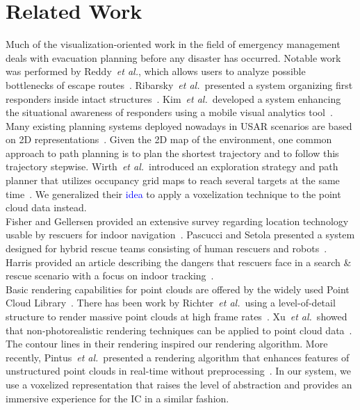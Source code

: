 \documentclass{egpubl}
\def\etal{\textit{et al.}}
\newcommand{\diff}[1]{\textcolor{blue}{#1}}
\begin{document}
\section{Related Work} \label{sec:relatedwork}
 Much of the visualization-oriented work in the field of emergency management deals with evacuation planning before any disaster has occurred. Notable work was performed by Reddy~\etal, which allows users to analyze possible bottlenecks of escape routes~\cite{EuroVA12:13-17:2012}. Ribarsky~\etal\ presented a system organizing first responders inside intact structures~\cite{Ribarsky:2010}. Kim~\etal\ developed a system enhancing the situational awareness of responders using a mobile visual analytics tool~\cite{Kim:2008}. Many existing planning systems deployed nowadays in USAR scenarios are based on 2D representations~\cite{kleiner_et_al_ssrr09,KohlbrecherMeyerStrykKlingaufFlexibleSlamSystem2011}. Given the 2D map of the environment, one common approach to path planning is to plan the shortest trajectory and to follow this trajectory stepwise. Wirth~\etal\ introduced an exploration strategy and path planner that utilizes occupancy grid maps to reach several targets at the same time~\cite{Wirth2007ETA1}. We generalized their \diff{idea} to apply a voxelization technique to the point cloud data instead.\\
%
 Fisher and Gellersen provided an extensive survey regarding location technology usable by rescuers for indoor navigation~\cite{fischer2010location}. Pascucci and Setola presented a system designed for hybrid rescue teams consisting of human rescuers and robots~\cite{pascucci2011indoor}. Harris provided an article describing the dangers that rescuers face in a search \& rescue scenario with a focus on indoor tracking~\cite{harris2013way}.\\
%
 Basic rendering capabilities for point clouds are offered by the widely used Point Cloud Library~\cite{Rusu11ICRA}. There has been work by Richter~\etal\ using a level-of-detail structure to render massive point clouds at high frame rates~\cite{Richter:2010:ORV:1811158.1811178}. Xu~\etal\ showed that non-photorealistic rendering techniques can be applied to point cloud data~\cite{conf/npar/XuC04}. The contour lines in their rendering inspired our rendering algorithm. More recently, Pintus~\etal\ presented a rendering algorithm that enhances features of unstructured point clouds in real-time without preprocessing~\cite{Pintus:2011:RRM:2384495.2384513}. In our system, we use a voxelized representation that raises the level of abstraction and provides an immersive experience for the IC in a similar fashion.
\end{document}
